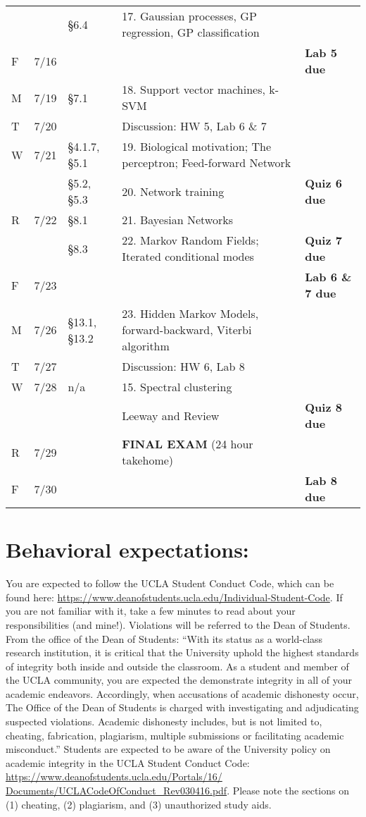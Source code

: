 \documentclass[11pt,letter]{article}
\begin{document}
\begin{tabular}{@{}p{}@{}p{}@{}p{}@{}p{}@{}>{\arraybackslash\raggedleft}p{}@{}}
&&   \S6.4 & 17. Gaussian processes, GP regression, GP classification\tabularnewline
F & 7/16&& & \textbf{Lab 5 due}\tabularnewline
\midrule
M& 7/19& \S7.1 & 18. Support vector machines, k-SVM\tabularnewline
T & 7/20 && Discussion: HW 5, Lab 6 \& 7 \tabularnewline
W& 7/21& \S4.1.7, \S5.1 & 19. Biological motivation; The perceptron; Feed-forward Network\tabularnewline
&&  \S5.2, \S5.3 & 20. Network training& \textbf{Quiz 6 due}\tabularnewline
R& 7/22& \S8.1 & 21. Bayesian Networks\tabularnewline
&& \S8.3 & 22. Markov Random Fields; Iterated conditional modes & \textbf{Quiz 7 due}\tabularnewline
F& 7/23 &&& \textbf{Lab 6 \& 7 due}\tabularnewline
\midrule
M& 7/26& \S13.1, \S13.2 & 23. Hidden Markov Models, forward-backward, Viterbi algorithm \tabularnewline
T & 7/27 && Discussion: HW 6, Lab 8 \tabularnewline
W& 7/28& n/a & 15. Spectral clustering\tabularnewline
 && & Leeway and Review& \textbf{Quiz 8 due}\tabularnewline
R & 7/29& &  \textbf{FINAL EXAM} (24 hour takehome)\tabularnewline
F & 7/30&& & \textbf{Lab 8 due}\tabularnewline
\bottomrule
\end{tabular}


\newpage
\section*{Behavioral expectations:}
You are expected to follow the UCLA Student Conduct Code, which can be found
here: \url{https://www.deanofstudents.ucla.edu/Individual-Student-Code}. If
you are not familiar with it, take a few minutes to read about your responsibilities
(and mine!). Violations will be referred to the Dean of Students.\\

From the office of the Dean of Students: ``With its status as a world-class research
institution, it is critical that the University uphold the highest standards of integrity both
inside and outside the classroom. As a student and member of the UCLA community, you
are expected the demonstrate integrity in all of your academic endeavors. Accordingly, when
accusations of academic dishonesty occur, The Office of the Dean of Students is charged with
investigating and adjudicating suspected violations. Academic dishonesty includes, but is not
limited to, cheating, fabrication, plagiarism, multiple submissions or facilitating academic
misconduct.''
Students are expected to be aware of the University policy on academic integrity in
the UCLA Student Conduct Code: \url{https://www.deanofstudents.ucla.edu/Portals/16/
Documents/UCLACodeOfConduct_Rev030416.pdf}. Please note the sections on (1) cheating,
(2) plagiarism, and (3) unauthorized study aids.
\end{document}
